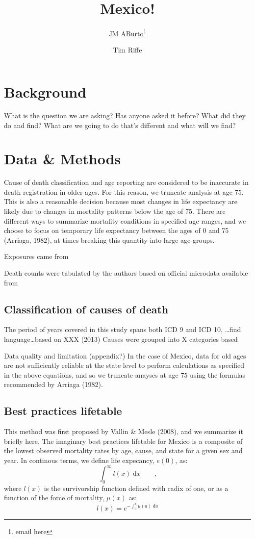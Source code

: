 \documentclass{article}
\title{Mexico!}
\author[1]{JM ABurto\thanks{email here}}
\author[2]{Tim Riffe}
\affil[1]{Max Planck/EDSD}
\affil[2]{Max Planck Institute for Demographic Research}
\newcommand{\dd}{\; \mathrm{d}}
\newcommand{\tc}{\quad\quad\text{,}}
\begin{document}
\maketitle

\section{Background}
What is the question we are asking? Has anyone asked it before? What did they do
and find? What are we going to do that's different and what will we find?

\section{Data \& Methods} 

Cause of death classification and age reporting are considered to be inaccurate in death registration in older ages. For this reason, we truncate analysis at age 75. This is also a reasonable decision because most changes in life expectancy are likely due to changes in mortality patterns below the age of 75. There are different ways to summarize mortality conditions in specified age ranges, and we choose to focus on temporary life expectancy between the ages of 0 and 75 (Arriaga, 1982), at times breaking this quantity into large age groups.

Exposures came from 

Death counts were tabulated by the authors based on official microdata available from 
\subsection{Classification of causes of death}
The period of years covered in this study spans both ICD 9 and ICD 10, \ldots find
language\ldots based on XXX (2013) Causes were grouped into X categories based 

Data quality and limitation (appendix?)
In the case of Mexico, data for old ages are not sufficiently reliable at the
state level to perform calculations as specified in the above equations, and so
we truncate anayses at age 75 using the formulas recommended by Arriaga (1982).
\subsection{Best practices lifetable}
This method was first proposed by Vallin \& Mesle (2008), and we summarize it
briefly here. The imaginary best practices lifetable for Mexico is a composite
of the lowest observed mortality rates by age, cause, and state for a given sex
and year. In continous terms, we define life expecancy, $e(0)$, as:
\begin{equation}
\int _0 ^\infty l(x) \dd x \tc
\end{equation}
where $l(x)$ is the survivorship function defined with radix of one, or as a
function of the force of mortality, $\mu(x)$ as:
\begin{equation}
\label{eq:lx}
l(x) = e^{-\int_0^x \mu(a) \dd a}
\end{equation}
\end{document}
